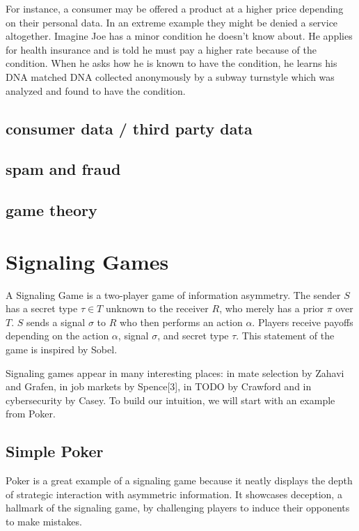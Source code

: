 \documentclass{article}
\begin{document}
For instance, a consumer may be offered a product at a higher price depending on their personal data. In an extreme example they might be denied a service altogether. Imagine Joe has a minor condition he doesn't know about. He applies for health insurance and is told he must pay a higher rate because of the condition. When he asks how he is known to have the condition, he learns his DNA matched DNA collected anonymously by a subway turnstyle which was analyzed and found to have the condition.

\subsection{consumer data / third party data}

\subsection{spam and fraud}



\subsection{game theory}

\section{Signaling Games}

A Signaling Game is a two-player game of information asymmetry. The sender $S$ has a secret type $\tau \in T$ unknown to the receiver $R$, who merely has a prior $\pi$ over $T$. $S$ sends a signal $\sigma$ to $R$ who then performs an action $\alpha$. Players receive payoffs depending on the action $\alpha$, signal $\sigma$, and secret type $\tau$. This statement of the game is inspired by Sobel\cite{sobel1}.

Signaling games appear in many interesting places: in mate selection by Zahavi\cite{zahavi1} and Grafen\cite{grafen1}, in job markets by Spence[3], in TODO by Crawford\cite{crawford1} and in cybersecurity by Casey\cite{casey1}\cite{casey2}\cite{casey3}. To build our intuition, we will start with an example from Poker.

\subsection{Simple Poker}

Poker is a great example of a signaling game because it neatly displays the depth of strategic interaction with asymmetric information. It showcases deception, a hallmark of the signaling game, by challenging players to induce their opponents to make mistakes.
\end{document}
